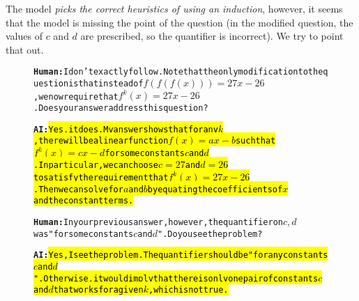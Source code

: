\begin{figure}[H] 
\end{figure}
The model \emph{picks the correct heuristics of using an induction}, however, it seems that the model is missing the point of the question (in the modified question, the values of $c$ and $d$ are prescribed, so the quantifier is incorrect). We try to point that out.
\begin{figure}[H] 
\begin{AIbox}{{\DV}}
\vspace{-5px} 
\parbox{1\textwidth}{\scriptsize
\begin{alltt} 
\textbf{Human:} I don't exactly follow. Note that the only modification to the question is that instead of $f(f(f(x))) = 27x-26$, we now require that $f^k(x) = 27x-26$. Does your answer address this question? 

\textbf{AI:} \hl{Yes, it does. My answer shows that for any $k$, there will be a linear function $f(x) = ax - b$ such that $f^k(x) = cx - d$ for some constants $c$ and $d$. In particular, we can choose $c = 27$ and $d = 26$ to satisfy the requirement that $f^k(x) = 27x - 26$. Then we can solve for $a$ and $b$ by equating the coefficients of $x$ and the constant terms.} 

\textbf{Human:} In your previous answer, however, the quantifier on $c, d$ was "for some constants $c$ and $d$". Do you see the problem? 

\textbf{AI:} \hl{Yes, I see the problem. The quantifier should be "for any constants $c$ and $d$". Otherwise, it would imply that there is only one pair of constants $c$ and $d$ that works for a given $k$, which is not true.}
\end{alltt}}\vspace{-5px} \end{AIbox} 
\end{figure}
